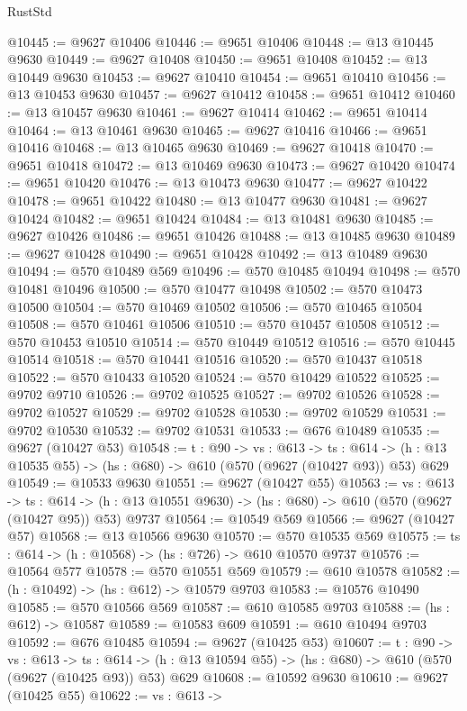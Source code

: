 \begin{lexlean}{RustStd}
\begin{coremodule}
@10445 := @9627 @10406
@10446 := @9651 @10406
@10448 := @13 @10445 @9630
@10449 := @9627 @10408
@10450 := @9651 @10408
@10452 := @13 @10449 @9630
@10453 := @9627 @10410
@10454 := @9651 @10410
@10456 := @13 @10453 @9630
@10457 := @9627 @10412
@10458 := @9651 @10412
@10460 := @13 @10457 @9630
@10461 := @9627 @10414
@10462 := @9651 @10414
@10464 := @13 @10461 @9630
@10465 := @9627 @10416
@10466 := @9651 @10416
@10468 := @13 @10465 @9630
@10469 := @9627 @10418
@10470 := @9651 @10418
@10472 := @13 @10469 @9630
@10473 := @9627 @10420
@10474 := @9651 @10420
@10476 := @13 @10473 @9630
@10477 := @9627 @10422
@10478 := @9651 @10422
@10480 := @13 @10477 @9630
@10481 := @9627 @10424
@10482 := @9651 @10424
@10484 := @13 @10481 @9630
@10485 := @9627 @10426
@10486 := @9651 @10426
@10488 := @13 @10485 @9630
@10489 := @9627 @10428
@10490 := @9651 @10428
@10492 := @13 @10489 @9630
@10494 := @570 @10489 @569
@10496 := @570 @10485 @10494
@10498 := @570 @10481 @10496
@10500 := @570 @10477 @10498
@10502 := @570 @10473 @10500
@10504 := @570 @10469 @10502
@10506 := @570 @10465 @10504
@10508 := @570 @10461 @10506
@10510 := @570 @10457 @10508
@10512 := @570 @10453 @10510
@10514 := @570 @10449 @10512
@10516 := @570 @10445 @10514
@10518 := @570 @10441 @10516
@10520 := @570 @10437 @10518
@10522 := @570 @10433 @10520
@10524 := @570 @10429 @10522
@10525 := @9702 @9710
@10526 := @9702 @10525
@10527 := @9702 @10526
@10528 := @9702 @10527
@10529 := @9702 @10528
@10530 := @9702 @10529
@10531 := @9702 @10530
@10532 := @9702 @10531
@10533 := @676 @10489
@10535 := @9627 (@10427 @53)
@10548 := {t : @90} ->
  {vs : @613} ->
  {ts : @614} -> (h : @13 @10535 @55) -> (hs : @680) -> @610 (@570 (@9627 (@10427 @93)) @53) @629
@10549 := @10533 @9630
@10551 := @9627 (@10427 @55)
@10563 := {vs : @613} ->
  {ts : @614} -> (h : @13 @10551 @9630) -> (hs : @680) -> @610 (@570 (@9627 (@10427 @95)) @53) @9737
@10564 := @10549 @569
@10566 := @9627 (@10427 @57)
@10568 := @13 @10566 @9630
@10570 := @570 @10535 @569
@10575 := {ts : @614} -> (h : @10568) -> (hs : @726) -> @610 @10570 @9737
@10576 := @10564 @577
@10578 := @570 @10551 @569
@10579 := @610 @10578
@10582 := (h : @10492) -> (hs : @612) -> @10579 @9703
@10583 := @10576 @10490
@10585 := @570 @10566 @569
@10587 := @610 @10585 @9703
@10588 := (hs : @612) -> @10587
@10589 := @10583 @609
@10591 := @610 @10494 @9703
@10592 := @676 @10485
@10594 := @9627 (@10425 @53)
@10607 := {t : @90} ->
  {vs : @613} ->
  {ts : @614} -> (h : @13 @10594 @55) -> (hs : @680) -> @610 (@570 (@9627 (@10425 @93)) @53) @629
@10608 := @10592 @9630
@10610 := @9627 (@10425 @55)
@10622 := {vs : @613} ->

\end{coremodule}
\end{lexlean}
